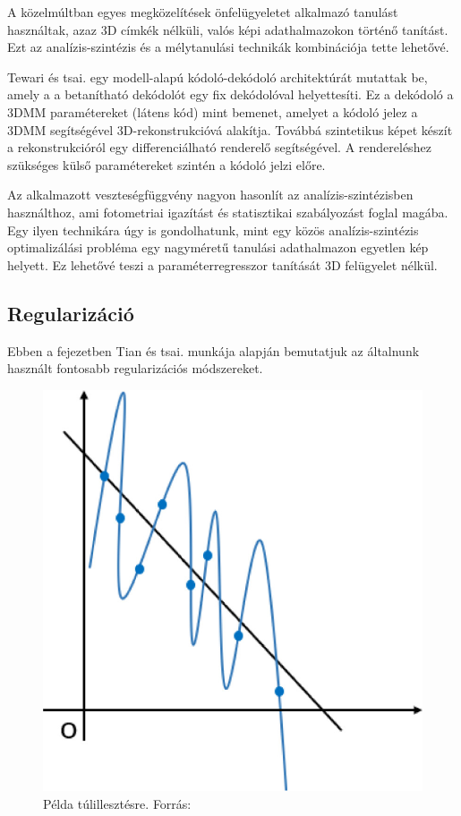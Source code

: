\documentclass[12pt,a4]{article}
\begin{document}
	A közelmúltban egyes megközelítések \cite{3dmm} önfelügyeletet alkalmazó
	tanulást használtak, azaz 3D címkék nélküli, valós képi adathalmazokon történő tanítást.
	Ezt az analízis-szintézis és a mélytanulási technikák kombinációja tette lehetővé.
	
	Tewari és tsai. \cite{tewari} egy modell-alapú kódoló-dekódoló architektúrát mutattak be, amely a
	a betanítható dekódolót egy fix dekódolóval helyettesíti. Ez a dekódoló a 3DMM paramétereket (látens kód)
	mint bemenet, amelyet a kódoló jelez a 3DMM segítségével 3D-rekonstrukcióvá alakítja.
	Továbbá szintetikus képet készít a rekonstrukcióról egy differenciálható renderelő segítségével.
	A rendereléshez szükséges külső paramétereket szintén a kódoló jelzi előre. 
	
	Az alkalmazott veszteségfüggvény nagyon hasonlít az analízis-szintézisben használthoz, ami fotometriai igazítást és statisztikai szabályozást foglal magába. Egy ilyen technikára úgy is gondolhatunk, mint egy közös analízis-szintézis optimalizálási probléma egy nagyméretű tanulási
	adathalmazon egyetlen kép helyett. Ez lehetővé teszi a paraméterregresszor tanítását 3D felügyelet nélkül.

    \subsection{Regularizáció}

        Ebben a fejezetben Tian és tsai. \cite{regularization-survey} munkája alapján bemutatjuk az általnunk használt fontosabb regularizációs módszereket.

        \begin{figure}[h]	
     		 \centering
     		 \includegraphics[width=0.5\linewidth]{overfitting.jpg}
     		 \caption{Példa túlillesztésre.
     			    Forrás: \cite{regularization-survey}}
                \label{fig:overfitting}
     	\end{figure}
        
\end{document}
